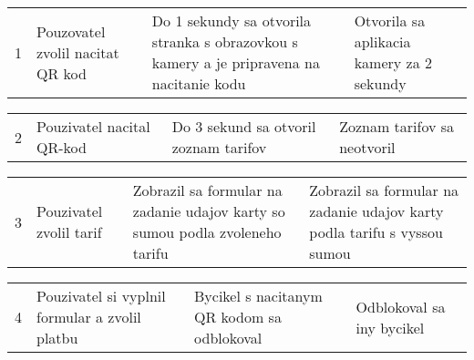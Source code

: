 \begin{table}[h]
  \begin{tabularx}{\mytablewidth}{|p{2em}|X|X|X|} 
      \hline 
      1 & 
      Pouzovatel zvolil nacitat QR kod & 
      Do 1 sekundy sa otvorila stranka s obrazovkou s kamery a je pripravena na nacitanie kodu & 
      Otvorila sa aplikacia kamery za 2 sekundy
  \end{tabularx}
  \begin{tabularx}{\mytablewidth}{|p{2em}|X|X|X|} 
      \hline 
      2 & 
      Pouzivatel nacital QR-kod& 
      Do 3 sekund sa otvoril zoznam tarifov& 
      Zoznam tarifov sa neotvoril
  \end{tabularx}
  \begin{tabularx}{\mytablewidth}{|p{2em}|X|X|X|} 
      \hline 
      3 & 
      Pouzivatel zvolil tarif& 
      Zobrazil sa formular na zadanie udajov karty so sumou podla zvoleneho tarifu& 
      Zobrazil sa formular na zadanie udajov karty podla tarifu s vyssou sumou
  \end{tabularx}
  \begin{tabularx}{\mytablewidth}{|p{2em}|X|X|X|} 
      \hline 
      4 & 
      Pouzivatel si vyplnil formular a zvolil platbu& 
      Bycikel s  nacitanym QR kodom sa odblokoval & 
      Odblokoval sa iny bycikel
  \end{tabularx}
  \begin{tabularx}{\mytablewidth}{|X|} 
      \hline
  \end{tabularx}
\end{table}


